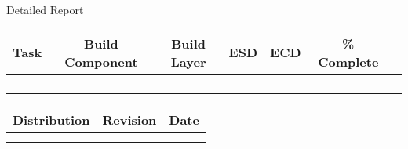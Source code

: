 \documentclass[a4paper,12pt]{article}
\begin{document}
  \pagebreak
 
   
  

       \caption{Detailed Report}     
     \begin{tabular}{||c|c|c|c|c|c|c||}
	  \hline
	 {\bfseries Task} & {\bfseries Build Component} &{\bfseries Build Layer} &{\bfseries ESD} & {\bfseries ECD} & {\bfseries \% Complete} &{\bfseries{Resource} \\
	  \hline
	  \hline
	      &  &  &  &  &  &  \\
	  \hline
	      &  &  &  &  &  &  \\
	  \hline
	      &  &  &  &  &  &  \\
	  \hline
	      &  &  &  &  &  &  \\
	  \hline
	  
	\end{tabular}
      
      
      
      \pagebreak

      \begin{tabular}{|p{5cm}|p{5cm}|p{2cm}|}
	\hline
	{\bfseries Distribution} & {\bfseries Revision} & {\bfseries Date} \\
	\hline
 
	      &  &  \\
	\hline
	      &  &  \\
	\hline
      \end{tabular}
\end{document}
